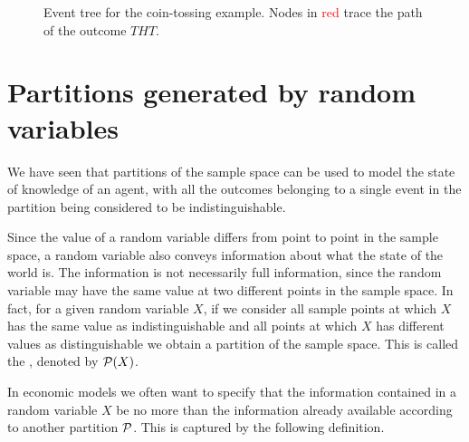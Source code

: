 \documentclass[11pt,reqno,openany]{amsbook}
\begin{document}
\begin{figure}
  \centering
  \caption{Event tree for the coin-tossing example. Nodes in
  \textcolor{red}{red} trace the path of the outcome $THT$.}
  \label{fig:cointoss-tree}
\end{figure}

\section{Partitions generated by random variables}
We have seen that partitions of the sample space can be used
to model the state of knowledge of an agent, with all the
outcomes belonging to a single event in the partition 
being considered to be indistinguishable.

Since the value of a random variable differs from point to
point in the sample space, a random variable also conveys
information about what the state of the world is. The
information is not necessarily full information, since the
random variable may have the same value at two different
points in the sample space. In fact, for a given random
variable $X$, if we consider all sample points at which $X$
has the same value as indistinguishable and all points at
which $X$ has different values as distinguishable we obtain
a partition of the sample space. This is called the
, denoted by $\mathcal{P}(X)$.

In economic models we often want to specify that the
information contained in a random variable $X$ be no more
than the information already available according to another
partition $\mathcal{P}$. This is captured by the following
definition.
\end{document}
